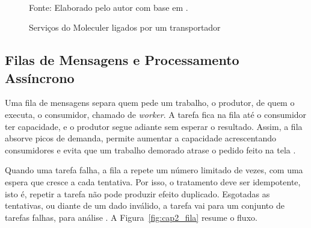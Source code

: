 \begin{figure}[H]
    \centering
    \caption{Serviços do Moleculer ligados por um transportador}
    \label{fig:cap2_moleculer}
    \vspace{0.4cm}
    \vspace{0.2cm} \\
    Fonte: Elaborado pelo autor com base em \textcite{BIGHETI2020}.
\end{figure}

\subsection{Filas de Mensagens e Processamento Assíncrono}

\par Uma fila de mensagens separa quem pede um trabalho, o produtor, de quem o executa, o consumidor, chamado de \emph{worker}. A tarefa fica na fila até o consumidor ter capacidade, e o produtor segue adiante sem esperar o resultado. Assim, a fila absorve picos de demanda, permite aumentar a capacidade acrescentando consumidores e evita que um trabalho demorado atrase o pedido feito na tela \cite{BULLMQ_DOCS}.

\par Quando uma tarefa falha, a fila a repete um número limitado de vezes, com uma espera que cresce a cada tentativa. Por isso, o tratamento deve ser idempotente, isto é, repetir a tarefa não pode produzir efeito duplicado. Esgotadas as tentativas, ou diante de um dado inválido, a tarefa vai para um conjunto de tarefas falhas, para análise \cite{BULLMQ_DOCS}. A Figura~\ref{fig:cap2_fila} resume o fluxo.

